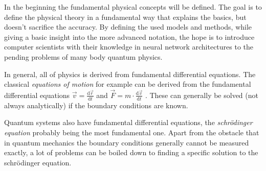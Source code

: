In the beginning the fundamental physical concepts will be defined. 
The goal is to define the physical theory in a fundamental way that explains the basics, but doesn't sacrifice the accuracy. 
By defining the used models and methods, while giving a basic insight into the more advanced notation, the hope is to introduce computer scientists with their knowledge in neural network architectures to the pending problems of many body quantum physics.

In general, all of physics is derived from fundamental differential equations. 
The classical \emph{equations of motion} for example can be derived from the fundamental differential equations $\vec{v} = \frac{\mathrm{d}\vec{r}}{\mathrm{d}t}$ and $\vec{F} = m \cdot \frac{\mathrm{d}\vec{v}}{\mathrm{d}t}$ \cite*[]{demtroderExperimentalphysik}.
These can generally be solved (not always analytically) if the boundary conditions are known.

Quantum systems also have fundamental differential equations, the \emph{schrödinger equation} probably being the most fundamental one. Apart from the obstacle that in quantum mechanics the boundary conditions generally cannot be measured exactly, a lot of problems can be boiled down to finding a specific solution to the schrödinger equation.